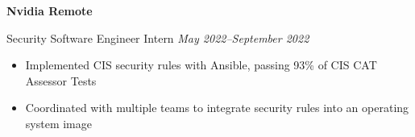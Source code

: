 \textbf{Nvidia \hfill Remote}\par

Security Software Engineer Intern \hfill \textit{May 2022--September 2022}
\begin{itemize}
	\item Implemented CIS security rules with Ansible, passing 93\% of CIS CAT Assessor Tests
	\item Coordinated with multiple teams to integrate security rules into an operating system image
\end{itemize}\par
